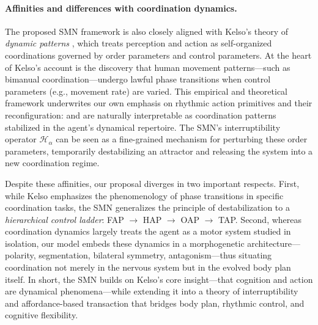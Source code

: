 \paragraph{Affinities and differences with coordination dynamics.}
The proposed SMN framework is also closely aligned with Kelso’s theory of \emph{dynamic patterns} \citep{Kelso1995}, which treats perception and action as self-organized coordinations governed by order parameters and control parameters. At the heart of Kelso’s account is the discovery that human movement patterns—such as bimanual coordination—undergo lawful phase transitions when control parameters (e.g., movement rate) are varied. This empirical and theoretical framework underwrites our own emphasis on rhythmic action primitives and their reconfiguration: \FAPs{} and \OAPs{} are naturally interpretable as coordination patterns stabilized in the agent’s dynamical repertoire. The SMN’s interruptibility operator $\mathcal{H}_{\alpha}$ can be seen as a fine-grained mechanism for perturbing these order parameters, temporarily destabilizing an attractor and releasing the system into a new coordination regime.

Despite these affinities, our proposal diverges in two important respects. First, while Kelso emphasizes the phenomenology of phase transitions in specific coordination tasks, the SMN generalizes the principle of destabilization to a \emph{hierarchical control ladder}: FAP $\rightarrow$ HAP $\rightarrow$ OAP $\rightarrow$ TAP. Second, whereas coordination dynamics largely treats the agent as a motor system studied in isolation, our model embeds these dynamics in a morphogenetic architecture—polarity, segmentation, bilateral symmetry, antagonism—thus situating coordination not merely in the nervous system but in the evolved body plan itself. In short, the SMN builds on Kelso’s core insight—that cognition and action are dynamical phenomena—while extending it into a theory of interruptibility and affordance-based transaction that bridges body plan, rhythmic control, and cognitive flexibility.

